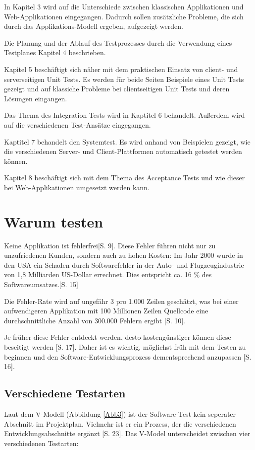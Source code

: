 \documentclass[a4paper,bibtotoc,oneside]{scrbook}
\begin{document}
In Kapitel 3 wird auf die Unterschiede zwischen klassischen Applikationen und Web-Applikationen eingegangen. Dadurch sollen zusätzliche Probleme, die sich durch das Applikations-Modell ergeben, aufgezeigt werden.

Die Planung und der Ablauf des Testprozesses durch die Verwendung eines Testplanes Kapitel 4 beschrieben. 

Kapitel 5 beschäftigt sich näher mit dem praktischen Einsatz von client- und serverseitigen Unit Tests. Es werden für beide Seiten Beispiele eines Unit Tests gezeigt und auf klassiche Probleme bei clientseitigen Unit Tests und deren Lösungen eingangen.

Das Thema des Integration Tests wird in Kaptitel 6 behandelt. Außerdem wird auf die verschiedenen Test-Ansätze eingegangen.

Kaptitel 7 behandelt den Systemtest. Es wird anhand von Beispielen gezeigt, wie die verschiedenen Server- und Client-Plattformen automatisch getestet werden können.

Kapitel 8 beschäftigt sich mit dem Thema des Acceptance Tests und wie dieser bei Web-Applikationen umgesetzt werden kann.

\chapter{Warum testen}
Keine Applikation ist fehlerfrei\cite{empiric_invest}[S. 9]. Diese Fehler  führen nicht nur zu unzufriedenen Kunden, sondern auch zu hohen Kosten: \glqq Im Jahr 2000 wurde in den USA ein Schaden durch Softwarefehler in der Auto- und Flugzeugindustrie von 1,8 Milliarden US-Dollar errechnet. Dies entspricht ca. 16 \% des Softwareumsatzes.\grqq\cite{betrieb}[S. 15]

Die Fehler-Rate wird auf ungefähr 3 pro 1.000 Zeilen geschätzt, was bei einer aufwendigeren Applikation mit 100 Millionen Zeilen Quellcode eine durchschnittliche Anzahl von 300.000 Fehlern ergibt \cite{eval_regression}[S. 10]. 

Je früher diese Fehler entdeckt werden, desto kostengünstiger können diese beseitigt werden \cite{betrieb}[S. 17]. Daher ist es wichtig, möglichst früh mit dem Testen zu beginnen und den Software-Entwicklungsprozess dementsprechend anzupassen \cite{betrieb}[S. 16]. 

\section{Verschiedene Testarten}
Laut dem V-Modell (Abbildung \ref{Abb3}) ist der Software-Test kein seperater Abschnitt im Projektplan. Vielmehr ist er ein Prozess, der die verschiedenen Entwicklungsabschnitte ergänzt \cite{betrieb}[S. 23]. Das V-Model unterscheidet zwischen vier verschiedenen Testarten:
\end{document}
